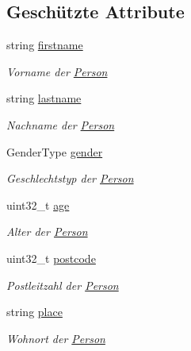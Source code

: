 \subsection*{Geschützte Attribute}
\begin{DoxyCompactItemize}
\item 
string \hyperlink{classContactManager_1_1Person_a9337552bd8f1b26c6d9b73294d524948}{firstname}
\begin{DoxyCompactList}\small\item\em Vorname der \hyperlink{classContactManager_1_1Person}{Person}\end{DoxyCompactList}\item 
string \hyperlink{classContactManager_1_1Person_ac445e26ae314d647bd8ee1319f709167}{lastname}
\begin{DoxyCompactList}\small\item\em Nachname der \hyperlink{classContactManager_1_1Person}{Person}\end{DoxyCompactList}\item 
Gender\+Type \hyperlink{classContactManager_1_1Person_a0bd13df83ce9266e7963e8e750e60388}{gender}
\begin{DoxyCompactList}\small\item\em Geschlechtstyp der \hyperlink{classContactManager_1_1Person}{Person}\end{DoxyCompactList}\item 
uint32\+\_\+t \hyperlink{classContactManager_1_1Person_a213b6be638a046de34bce8fc8301288c}{age}
\begin{DoxyCompactList}\small\item\em Alter der \hyperlink{classContactManager_1_1Person}{Person}\end{DoxyCompactList}\item 
uint32\+\_\+t \hyperlink{classContactManager_1_1Person_a2fd82a38ead08ec16730736327e6ef63}{postcode}
\begin{DoxyCompactList}\small\item\em Postleitzahl der \hyperlink{classContactManager_1_1Person}{Person}\end{DoxyCompactList}\item 
string \hyperlink{classContactManager_1_1Person_a1714ccedb4e54e6725f7a67b8232dcc0}{place}
\begin{DoxyCompactList}\small\item\em Wohnort der \hyperlink{classContactManager_1_1Person}{Person}\end{DoxyCompactList}\item 

\end{DoxyCompactItemize}
